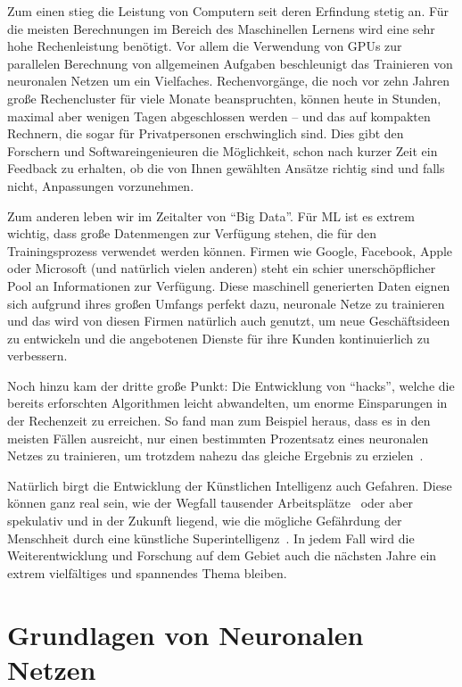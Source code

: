 Zum einen stieg die Leistung von Computern seit deren Erfindung stetig an. Für die meisten Berechnungen im Bereich des Maschinellen Lernens wird eine sehr hohe Rechenleistung benötigt. Vor allem die Verwendung von GPUs zur parallelen Berechnung von allgemeinen Aufgaben beschleunigt das Trainieren von neuronalen Netzen um ein Vielfaches. Rechenvorgänge, die noch vor zehn Jahren große Rechencluster für viele Monate beanspruchten, können heute in Stunden, maximal aber wenigen Tagen abgeschlossen werden -- und das auf kompakten Rechnern, die sogar für Privatpersonen erschwinglich sind. Dies gibt den Forschern und Softwareingenieuren die Möglichkeit, schon nach kurzer Zeit ein Feedback zu erhalten, ob die von Ihnen gewählten Ansätze richtig sind und falls nicht, Anpassungen vorzunehmen.

Zum anderen leben wir im Zeitalter von "`Big Data"'. Für \gls{ML} ist es extrem wichtig, dass große Datenmengen zur Verfügung stehen, die für den Trainingsprozess verwendet werden können. Firmen wie Google, Facebook, Apple oder Microsoft (und natürlich vielen anderen) steht ein schier unerschöpflicher Pool an Informationen zur Verfügung. Diese maschinell generierten Daten eignen sich aufgrund ihres großen Umfangs perfekt dazu, neuronale Netze zu trainieren und das wird von diesen Firmen natürlich auch genutzt, um neue Geschäftsideen zu entwickeln und die angebotenen Dienste für ihre Kunden kontinuierlich zu verbessern.

Noch hinzu kam der dritte große Punkt: Die Entwicklung von "`hacks"', welche die bereits erforschten Algorithmen leicht abwandelten, um enorme Einsparungen in der Rechenzeit zu erreichen. So fand man zum Beispiel heraus, dass es in den meisten Fällen ausreicht, nur einen bestimmten Prozentsatz eines neuronalen Netzes zu trainieren, um trotzdem nahezu das gleiche Ergebnis zu erzielen~\cite{Bauckhage2016}.

Natürlich birgt die Entwicklung der Künstlichen Intelligenz auch Gefahren. Diese können ganz real sein, wie der Wegfall tausender Arbeitsplätze~\cite{Russell2015} oder aber spekulativ und in der Zukunft liegend, wie die mögliche Gefährdung der Menschheit durch eine künstliche Superintelligenz~\cite{Barrat2013}. In jedem Fall wird die Weiterentwicklung und Forschung auf dem Gebiet auch die nächsten Jahre ein extrem vielfältiges und spannendes Thema bleiben.

\section{Grundlagen von Neuronalen Netzen}
